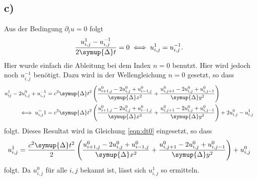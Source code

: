 \subsection*{c)}
Aus der Bedingung $\partial_t u = 0$ folgt 
\begin{equation}
    \frac{u_{i,j}^1 - u_{i,j}^{-1}}{2\symup{\Delta}t } = 0 \iff u_{i,j}^1 = u_{i,j}^{-1}. \label{eqn:dt0}
\end{equation}
Hier wurde einfach die Ableitung bei dem Index $n=0$ benutzt.
Hier wird jedoch noch $u_{i,j}^{-1}$ benötigt.
Dazu wird in der Wellengleichung $n=0$ gesetzt, so dass 
\begin{align*}
    u_{ij}^{1} -2 u_{i,j}^{0} + u_{i,j}^{-1} &= c^2 \symup{\Delta} t^2 
    \left ( \frac{u_{i+1,j}^0 -2 u_{i,j}^0 + u_{i-1,j}^0 } {\symup{\Delta}x^2} 
    + \frac{u_{i,j+1}^0 -2 u_{i,j}^0 + u_{i,j-1}^0 } {\symup{\Delta}y^2} \right ) \\
    \iff u_{i,j}^-1 &= c^2 \symup{\Delta} t^2 
    \left ( \frac{u_{i+1,j}^0 -2 u_{i,j}^0 + u_{i-1,j}^0 } {\symup{\Delta}x^2} 
    + \frac{u_{i,j+1}^0 -2 u_{i,j}^0 + u_{i,j-1}^0 } {\symup{\Delta}y^2} \right ) + 2 u_{i,j}^0 - u_{i,j}^1
\end{align*}
folgt.
Dieses Resultat wird in Gleichung \eqref{eqn:dt0} eingesetzt, so dass 
\begin{equation*}
    u_{i,j}^1 = \frac{c^2 \symup{\Delta} t^2}{2}
    \left ( \frac{u_{i+1,j}^0 -2 u_{i,j}^0 + u_{i-1,j}^0 } {\symup{\Delta}x^2} 
    + \frac{u_{i,j+1}^0 -2 u_{i,j}^0 + u_{i,j-1}^0 } {\symup{\Delta}y^2} \right ) + u_{i,j}^0
\end{equation*}
folgt.
Da $u_{i,j}^0$ für alle $i,j$ bekannt ist, lässt sich $u_{i,j}^1$ so ermitteln.
